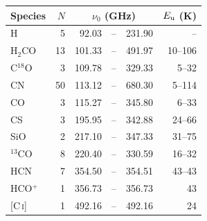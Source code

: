 \begin{tabular}{@{}lrr@{\,}c@{\,}rr@{}}
\hline
Species & $N$ & \multicolumn{3}{c}{$\nu_0$ (GHz)} & $E_{\rm u}$ (K) \\
\hline
H & 5 & 92.03 & -- & 231.90 & -- \\
H$_2$CO & 13 & 101.33 & -- & 491.97 & 10--106 \\
C$^{18}$O & 3 & 109.78 & -- & 329.33 & 5--32 \\
CN & 50 & 113.12 & -- & 680.30 & 5--114 \\
CO & 3 & 115.27 & -- & 345.80 & 6--33 \\
CS & 3 & 195.95 & -- & 342.88 & 24--66 \\
SiO & 2 & 217.10 & -- & 347.33 & 31--75 \\
$^{13}$CO & 8 & 220.40 & -- & 330.59 & 16--32 \\
HCN & 7 & 354.50 & -- & 354.51 & 43--43 \\
HCO$^{+}$ & 1 & 356.73 & -- & 356.73 & 43 \\
{[C\,\textsc{i}]} & 1 & 492.16 & -- & 492.16 & 24 \\
\hline
\end{tabular}%
